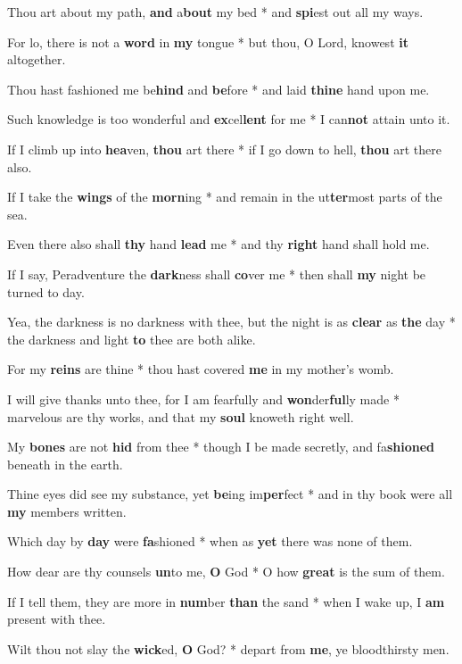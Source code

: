 \begin{multicols}{2}
	Thou art about my path, \textbf{and} a\textbf{bout} my bed * and \textbf{spi}est out all my ways.
	
	For lo, there is not a \textbf{word} in \textbf{my} tongue * but thou, O Lord, knowest \textbf{it} altogether.
	
	Thou hast fashioned me be\textbf{hind} and \textbf{be}fore * and laid \textbf{thine} hand upon me.
	
	Such knowledge is too wonderful and \textbf{ex}cel\textbf{lent} for me * I can\textbf{not} attain unto it.
	
	If I climb up into \textbf{hea}ven, \textbf{thou} art there * if I go down to hell, \textbf{thou} art there also.
	
	If I take the \textbf{wings} of the \textbf{morn}ing * and remain in the ut\textbf{ter}most parts of the sea.
	
	Even there also shall \textbf{thy} hand \textbf{lead} me * and thy \textbf{right} hand shall hold me.
	
	If I say, Peradventure the \textbf{dark}ness shall \textbf{co}ver me * then shall \textbf{my} night be turned to day.
	
	Yea, the darkness is no darkness with thee, but the night is as \textbf{clear} as \textbf{the} day * the darkness and light \textbf{to} thee are both alike.
	
	For my \textbf{reins} are thine * thou hast covered \textbf{me} in my mother's womb.
	
	I will give thanks unto thee, for I am fearfully and \textbf{won}der\textbf{ful}ly made * marvelous are thy works, and that my \textbf{soul} knoweth right well.
	
	My \textbf{bones} are not \textbf{hid} from thee * though I be made secretly, and fa\textbf{shioned} beneath in the earth.
	
	Thine eyes did see my substance, yet \textbf{be}ing im\textbf{per}fect * and in thy book were all \textbf{my} members written.
	
	Which day by \textbf{day} were \textbf{fa}shioned * when as \textbf{yet} there was none of them.
	
	How dear are thy counsels \textbf{un}to me, \textbf{O} God * O how \textbf{great} is the sum of them.
	
	If I tell them, they are more in \textbf{num}ber \textbf{than} the sand * when I wake up, I \textbf{am} present with thee.
	
	Wilt thou not slay the \textbf{wick}ed, \textbf{O} God? * depart from \textbf{me}, ye bloodthirsty men.
	

\end{multicols}
